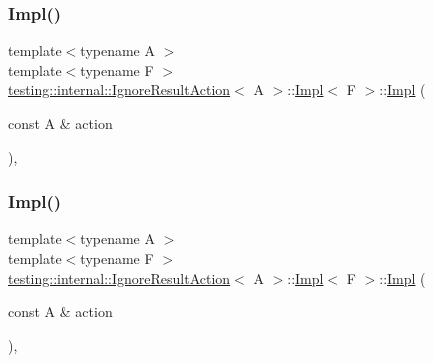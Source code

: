 \mbox{\label{classtesting_1_1internal_1_1_ignore_result_action_1_1_impl_a0252ee58746d81d31b92526b2336892e}} 
\subsubsection{\texorpdfstring{Impl()}{Impl()}\hspace{0.1cm}{\footnotesize\ttfamily [2/3]}}
{\footnotesize\ttfamily template$<$typename A $>$ \\
template$<$typename F $>$ \\
\mbox{\hyperlink{classtesting_1_1internal_1_1_ignore_result_action}{testing\+::internal\+::\+Ignore\+Result\+Action}}$<$ A $>$\+::\mbox{\hyperlink{classtesting_1_1internal_1_1_ignore_result_action_1_1_impl}{Impl}}$<$ F $>$\+::\mbox{\hyperlink{classtesting_1_1internal_1_1_ignore_result_action_1_1_impl}{Impl}} (\begin{DoxyParamCaption}\item[{const A \&}]{action }\end{DoxyParamCaption})\hspace{0.3cm}{\ttfamily [inline]}, {\ttfamily [explicit]}}

\mbox{\label{classtesting_1_1internal_1_1_ignore_result_action_1_1_impl_a0252ee58746d81d31b92526b2336892e}} 
\subsubsection{\texorpdfstring{Impl()}{Impl()}\hspace{0.1cm}{\footnotesize\ttfamily [3/3]}}
{\footnotesize\ttfamily template$<$typename A $>$ \\
template$<$typename F $>$ \\
\mbox{\hyperlink{classtesting_1_1internal_1_1_ignore_result_action}{testing\+::internal\+::\+Ignore\+Result\+Action}}$<$ A $>$\+::\mbox{\hyperlink{classtesting_1_1internal_1_1_ignore_result_action_1_1_impl}{Impl}}$<$ F $>$\+::\mbox{\hyperlink{classtesting_1_1internal_1_1_ignore_result_action_1_1_impl}{Impl}} (\begin{DoxyParamCaption}\item[{const A \&}]{action }\end{DoxyParamCaption})\hspace{0.3cm}{\ttfamily [inline]}, {\ttfamily [explicit]}}



